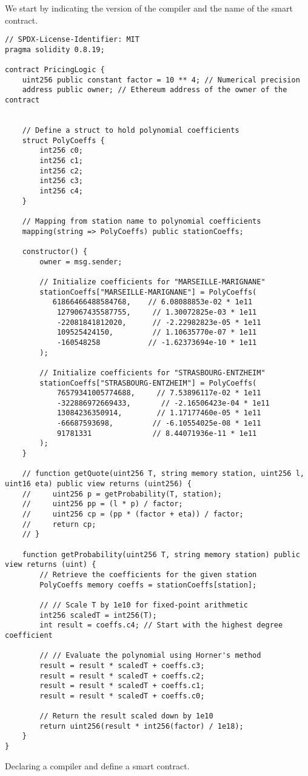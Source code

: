 \documentclass[10pt]{article}
\begin{document}
We start by indicating the version of the compiler and the name of the smart contract. 
\begin{codefragment}[!ht]
\begin{lstlisting}[language=Solidity]
// SPDX-License-Identifier: MIT
pragma solidity 0.8.19;

contract PricingLogic {
    uint256 public constant factor = 10 ** 4; // Numerical precision
    address public owner; // Ethereum address of the owner of the contract
    

    // Define a struct to hold polynomial coefficients
    struct PolyCoeffs {
        int256 c0;
        int256 c1;
        int256 c2;
        int256 c3;
        int256 c4;
    }

    // Mapping from station name to polynomial coefficients
    mapping(string => PolyCoeffs) public stationCoeffs;

    constructor() {
        owner = msg.sender;

        // Initialize coefficients for "MARSEILLE-MARIGNANE"
        stationCoeffs["MARSEILLE-MARIGNANE"] = PolyCoeffs(
           61866466488584768,    // 6.08088853e-02 * 1e11
            1279067435587755,     // 1.30072825e-03 * 1e11
            -22081841812020,      // -2.22982823e-05 * 1e11
            109525424150,         // 1.10635770e-07 * 1e11
            -160548258           // -1.62373694e-10 * 1e11
        );

        // Initialize coefficients for "STRASBOURG-ENTZHEIM"
        stationCoeffs["STRASBOURG-ENTZHEIM"] = PolyCoeffs(
            76579341005774688,     // 7.53896117e-02 * 1e11
            -322886972669433,       // -2.16506423e-04 * 1e11
            13084236350914,        // 1.17177460e-05 * 1e11
            -66687593698,         // -6.10554025e-08 * 1e11
            91781331              // 8.44071936e-11 * 1e11
        );
    }

    // function getQuote(uint256 T, string memory station, uint256 l, uint16 eta) public view returns (uint256) {
    //     uint256 p = getProbability(T, station);
    //     uint256 pp = (l * p) / factor;
    //     uint256 cp = (pp * (factor + eta)) / factor;
    //     return cp;
    // }

    function getProbability(uint256 T, string memory station) public view returns (uint) {
        // Retrieve the coefficients for the given station
        PolyCoeffs memory coeffs = stationCoeffs[station];

        // // Scale T by 1e10 for fixed-point arithmetic
        int256 scaledT = int256(T);
        int result = coeffs.c4; // Start with the highest degree coefficient

        // // Evaluate the polynomial using Horner's method
        result = result * scaledT + coeffs.c3;
        result = result * scaledT + coeffs.c2;
        result = result * scaledT + coeffs.c1;
        result = result * scaledT + coeffs.c0;

        // Return the result scaled down by 1e10
        return uint256(result * int256(factor) / 1e18);
    }
}
\end{lstlisting}
    \caption{Declaring a compiler and define a smart contract.}
    \label{code:contractdeclaration}
\end{codefragment}
\end{document}
